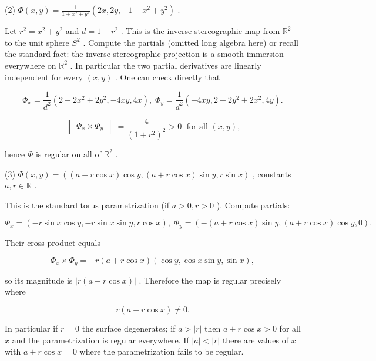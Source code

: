 \documentclass[10pt]{article}
\begin{document}
(2) \(\Phi \left( {x,y}\right)  = \frac{1}{1 + {x}^{2} + {y}^{2}}\left( {{2x},{2y}, - 1 + {x}^{2} + {y}^{2}}\right)\) .

Let \({r}^{2} = {x}^{2} + {y}^{2}\) and \(d = 1 + {r}^{2}\) . This is the inverse stereographic map from \({\mathbb{R}}^{2}\) to the unit sphere \({S}^{2}\) . Compute the partials (omitted long algebra here) or recall the standard fact: the inverse stereographic projection is a smooth immersion everywhere on \({\mathbb{R}}^{2}\) . In particular the two partial derivatives are linearly independent for every \(\left( {x,y}\right)\) . One can check directly that

\[
{\Phi }_{x} = \frac{1}{{d}^{2}}\left( {2 - 2{x}^{2} + 2{y}^{2}, - {4xy},{4x}}\right) ,\;{\Phi }_{y} = \frac{1}{{d}^{2}}\left( {-{4xy},2 - 2{y}^{2} + 2{x}^{2},{4y}}\right) .
\]

\[
\begin{Vmatrix}{{\Phi }_{x} \times  {\Phi }_{y}}\end{Vmatrix} = \frac{4}{{\left( 1 + {r}^{2}\right) }^{2}} > 0\;\text{ for all }\left( {x,y}\right) ,
\]

hence \(\Phi\) is regular on all of \({\mathbb{R}}^{2}\) .

(3) \(\Phi \left( {x,y}\right)  = \left( {\left( {a + r\cos x}\right) \cos y,\left( {a + r\cos x}\right) \sin y,r\sin x}\right)\) , constants \(a,r \in  \mathbb{R}\) .

This is the standard torus parametrization (if \(a > 0,r > 0\) ). Compute partials:

\[
{\Phi }_{x} = \left( {-r\sin x\cos y, - r\sin x\sin y,r\cos x}\right) ,\;{\Phi }_{y} = \left( {-\left( {a + r\cos x}\right) \sin y,\left( {a + r\cos x}\right) \cos y,0}\right) .
\]

Their cross product equals

\[
{\Phi }_{x} \times  {\Phi }_{y} =  - r\left( {a + r\cos x}\right) \left( {\cos y,\cos x\sin y,\sin x}\right) ,
\]

so its magnitude is \(\left| {r\left( {a + r\cos x}\right) }\right|\) . Therefore the map is regular precisely where

\[
r\left( {a + r\cos x}\right)  \neq  0.
\]

In particular if \(r = 0\) the surface degenerates; if \(a > \left| r\right|\) then \(a + r\cos x > 0\) for all \(x\) and the parametrization is regular everywhere. If \(\left| a\right|  < \left| r\right|\) there are values of \(x\) with \(a + r\cos x = 0\) where the parametrization fails to be regular.
\end{document}
